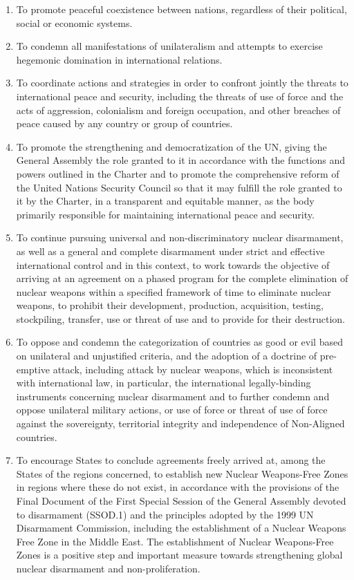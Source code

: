 \documentclass[
  openany]{book}
\begin{document}
\begin{enumerate}
\item
  To promote peaceful coexistence between nations, regardless of their political, social or economic systems.
\item
  To condemn all manifestations of unilateralism and attempts to exercise hegemonic domination in international relations.
\item
  To coordinate actions and strategies in order to confront jointly the threats to international peace and security, including the threats of use of force and the acts of aggression, colonialism and foreign occupation, and other breaches of peace caused by any country or group of countries.
\item
  To promote the strengthening and democratization of the UN, giving the General Assembly the role granted to it in accordance with the functions and powers outlined in the Charter and to promote the comprehensive reform of the United Nations Security Council so that it may fulfill the role granted to it by the Charter, in a transparent and equitable manner, as the body primarily responsible for maintaining international peace and security.
\item
  To continue pursuing universal and non-discriminatory nuclear disarmament, as well as a general and complete disarmament under strict and effective international control and in this context, to work towards the objective of arriving at an agreement on a phased program for the complete elimination of nuclear weapons within a specified framework of time to eliminate nuclear weapons, to prohibit their development, production, acquisition, testing, stockpiling, transfer, use or threat of use and to provide for their destruction.
\item
  To oppose and condemn the categorization of countries as good or evil based on unilateral and unjustified criteria, and the adoption of a doctrine of pre-emptive attack, including attack by nuclear weapons, which is inconsistent with international law, in particular, the international legally-binding instruments concerning nuclear disarmament and to further condemn and oppose unilateral military actions, or use of force or threat of use of force against the sovereignty, territorial integrity and independence of Non-Aligned countries.
\item
  To encourage States to conclude agreements freely arrived at, among the States of the regions concerned, to establish new Nuclear Weapons-Free Zones in regions where these do not exist, in accordance with the provisions of the Final Document of the First Special Session of the General Assembly devoted to disarmament (SSOD.1) and the principles adopted by the 1999 UN Disarmament Commission, including the establishment of a Nuclear Weapons Free Zone in the Middle East. The establishment of Nuclear Weapons-Free Zones is a positive step and important measure towards strengthening global nuclear disarmament and non-proliferation.

\end{enumerate}
\end{document}
